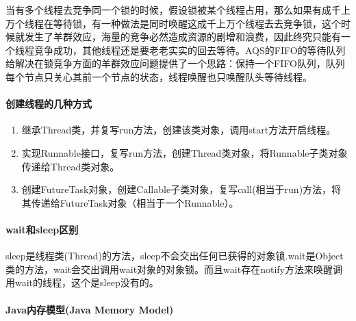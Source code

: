\documentclass[../../../interview-questions.tex]{subfiles}
\begin{document}
当有多个线程去竞争同一个锁的时候，假设锁被某个线程占用，那么如果有成千上万个线程在等待锁，有一种做法是同时唤醒这成千上万个线程去去竞争锁，这个时候就发生了羊群效应，海量的竞争必然造成资源的剧增和浪费，因此终究只能有一个线程竞争成功，其他线程还是要老老实实的回去等待。AQS的FIFO的等待队列给解决在锁竞争方面的羊群效应问题提供了一个思路：保持一个FIFO队列，队列每个节点只关心其前一个节点的状态，线程唤醒也只唤醒队头等待线程。



\paragraph{创建线程的几种方式}

\begin{enumerate}
\item {继承Thread类，并复写run方法，创建该类对象，调用start方法开启线程。}
\item{实现Runnable接口，复写run方法，创建Thread类对象，将Runnable子类对象传递给Thread类对象。}
\item{创建FutureTask对象，创建Callable子类对象，复写call(相当于run)方法，将其传递给FutureTask对象（相当于一个Runnable）。}
\end{enumerate}




\paragraph{wait和sleep区别}

sleep是线程类(Thread)的方法，sleep不会交出任何已获得的对象锁.wait是Object类的方法，wait会交出调用wait对象的对象锁。而且wait存在notify方法来唤醒调用wait的线程，这个是sleep没有的。

\paragraph{Java内存模型(Java Memory Model)}
\end{document}
